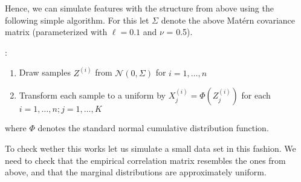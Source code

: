 \documentclass[letterpaper,10pt,english]{sphinxmanual}
\begin{document}
Hence, we can simulate features with the structure from above using the following simple algorithm. For this let \(\Sigma\) denote the above Matérn covariance matrix (parameterized with \(\ell = 0.1\) and \(\nu\) = 0.5).

:
\begin{enumerate}
%
\item {} 
Draw samples \(Z^{(i)}\) from \(\mathcal{N}(0, \Sigma)\) for \(i=1,\dots,n\)

\item {} 
Transform each sample to a uniform by \(X^{(i)}_j = \Phi(Z^{(i)}_j)\) for each \(i=1,\dots,n ; j=1,\dots,K\)

\end{enumerate}

where \(\Phi\) denotes the standard normal cumulative distribution function.

To check wether this works let us simulate a small data set in this fashion. We need to check that the empirical correlation matrix resembles the ones from above, and that the marginal distributions are approximately uniform.

\begin{sphinxVerbatim}[commandchars=\\\{\}]
  
  
   

  \PYG{p}{[}     \PYG{p}{]}
  
   

\end{sphinxVerbatim}

\noindent{}
\end{document}
